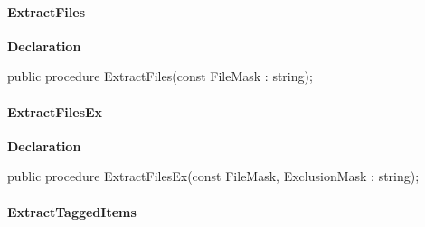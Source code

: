 \documentclass{report}
\newif\ifpdf
\begin{document}
\paragraph*{ExtractFiles}\hspace*{\fill}

\label{AbArcTyp.TAbArchive-ExtractFiles}
\begin{list}{}{
\setlength{\itemindent}{0cm}
\setlength{\listparindent}{0cm}
\setlength{\leftmargin}{\evensidemargin}
\addtolength{\leftmargin}{\tmplength}
\settowidth{\labelsep}{X}
\addtolength{\leftmargin}{\labelsep}
\setlength{\labelwidth}{\tmplength}
}
\item[\textbf{Declaration}\hfill]
\ifpdf
\begin{flushleft}
\fi
\begin{ttfamily}
public procedure ExtractFiles(const FileMask : string);\end{ttfamily}

\ifpdf
\end{flushleft}
\fi

\end{list}
\paragraph*{ExtractFilesEx}\hspace*{\fill}

\label{AbArcTyp.TAbArchive-ExtractFilesEx}
\begin{list}{}{
\setlength{\itemindent}{0cm}
\setlength{\listparindent}{0cm}
\setlength{\leftmargin}{\evensidemargin}
\addtolength{\leftmargin}{\tmplength}
\settowidth{\labelsep}{X}
\addtolength{\leftmargin}{\labelsep}
\setlength{\labelwidth}{\tmplength}
}
\item[\textbf{Declaration}\hfill]
\ifpdf
\begin{flushleft}
\fi
\begin{ttfamily}
public procedure ExtractFilesEx(const FileMask, ExclusionMask : string);\end{ttfamily}

\ifpdf
\end{flushleft}
\fi

\end{list}
\paragraph*{ExtractTaggedItems}\hspace*{\fill}
\end{document}
